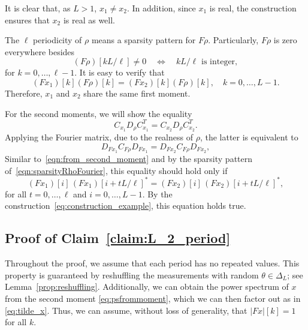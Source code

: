 \documentclass{IEEEtran}
\numberwithin{equation}{section}
\numberwithin{figure}{section}
\theoremstyle{plain}
\theoremstyle{definition}
\theoremstyle{remark}
\theoremstyle{plain}
\theoremstyle{remark}
\theoremstyle{plain}
\theoremstyle{plain}
\theoremstyle{remark}
\newcommand{\F}{F}
\begin{document}
It is clear that, as $L>1$, $x_1 \neq x_2$. In addition, since $x_1$ is real, the construction ensures that $x_2$ is real as well.

The $\ell$ periodicity of $\rho$ means a sparsity pattern for $\F{\rho}$. Particularly, $\F{\rho}$ is zero everywhere besides 
\begin{equation} \label{eqn:sparsityRhoFourier}  
(\F{\rho})\left[kL/\ell \right] \neq 0  \quad \Longleftrightarrow \quad kL/\ell  \text{  is integer} , 
\end{equation}
for $k=0,\ldots,\ell-1$.
It is easy to verify that 
\begin{equation*}  \label{eqn:ConditionOfPeriodicityFirstMoment}
(\F{x_1})[k] (\F{\rho})[k] = (\F{x_2})[k] (\F{\rho})[k]  , \quad k=0,\ldots,L-1.
\end{equation*}
Therefore, $x_1$ and $x_2$ share the same first moment.

For the second moments, we will show the equality 
\[   C_{x_1} D_\rho C_{x_1}^T =  C_{x_2} D_\rho C_{x_2}^T  . \]
Applying the Fourier matrix, due to the realness of $\rho$, the latter is equivalent to 
\[ D_{\F{x_1}} C_{\F{\rho}} D_{\F{x_1}} =  D_{\F{x_2}} C_{\F{\rho}} D_{\F{x_2}},\] 
Similar to~\eqref{eqn:from_second_moment} and by the sparsity pattern of~\eqref{eqn:sparsityRhoFourier}, this equality should hold only if
\begin{equation*} \label{eqn:ConditionOfPeriodicitySecondMoment}
(\F{x_1})[i] \, (\F{x_1})\left[i+tL/\ell \right]^\ast   = (\F{x_2})[i] \, (\F{x_2})\left[ i+tL/\ell \right]^\ast , 
\end{equation*}
for all $t=0,\ldots,\ell$ and $i=0,\ldots,L-1$. 
By the construction~\eqref{eq:construction_example}, this equation holds true. 

\subsection{Proof of Claim~\ref{claim:L_2_period}} \label{sec:proof_L_2_period} 

Throughout the proof, we assume that each period has no repeated values. This property is guaranteed by reshuffling the measurements with random $\theta \in \Delta_L$; see Lemma~\ref{prop:reshuffling}. Additionally, we can obtain the power spectrum of $x$ from the second moment \eqref{eq:psfrommoment}, which we can then factor out as in \eqref{eq:tilde_x}. Thus, we can assume, without loss of generality, that $\vert \F x\vert [k]=1$ for all $k$. 
\end{document}
